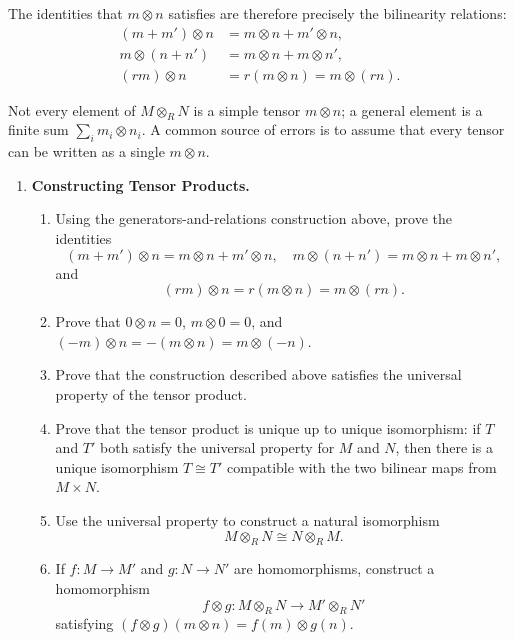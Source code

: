 \documentclass[12pt,reqno]{amsart}
\begin{document}
The identities that $m\otimes n$ satisfies are therefore precisely the bilinearity relations:
\begin{align*}
(m+m')\otimes n &= m\otimes n+m'\otimes n,\\
m\otimes(n+n') &= m\otimes n+m\otimes n',\\
(rm)\otimes n &= r(m\otimes n)=m\otimes(rn).
\end{align*}
 
Not every element of $M\otimes_R N$ is a simple tensor $m\otimes n$; a general element is a finite sum $\sum_i m_i\otimes n_i$. A common source of errors is to assume that every tensor can be written as a single $m\otimes n$.
 
\hrulefill

\begin{enumerate}[leftmargin=*, resume=problems]
\item \textbf{Constructing Tensor Products.}
    \begin{enumerate}
    \item Using the generators-and-relations construction above, prove the identities
    \[
    (m+m')\otimes n=m\otimes n+m'\otimes n,
    \quad
    m\otimes(n+n')=m\otimes n+m\otimes n',
    \]
    and
    \[
    (rm)\otimes n=r(m\otimes n)=m\otimes(rn).
    \]
    \item Prove that $0\otimes n=0$, $m\otimes 0=0$, and $(-m)\otimes n=-(m\otimes n)=m\otimes(-n)$.
    \item Prove that the construction described above satisfies the universal property of the tensor product.
    \item Prove that the tensor product is unique up to unique isomorphism: if $T$ and $T'$ both satisfy the universal property for $M$ and $N$, then there is a unique isomorphism $T\cong T'$ compatible with the two bilinear maps from $M\times N$.
    \item Use the universal property to construct a natural isomorphism
    \[
    M\otimes_R N\cong N\otimes_R M.
    \]
    \item If $f:M\to M'$ and $g:N\to N'$ are homomorphisms, construct a homomorphism
    \[
    f\otimes g:M\otimes_R N\to M'\otimes_R N'
    \]
    satisfying $(f\otimes g)(m\otimes n)=f(m)\otimes g(n)$.
    \end{enumerate}


\end{enumerate}
\end{document}
